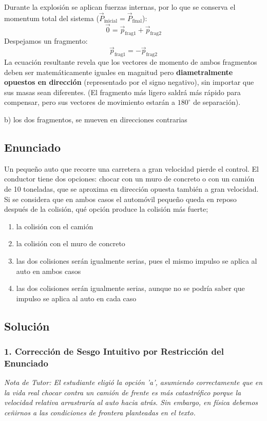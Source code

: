 \documentclass[12pt, a4paper]{article}
\begin{document}
Durante la explosión se aplican fuerzas internas, por lo que se conserva el momentum total del sistema ($\vec{P}_{\text{inicial}} = \vec{P}_{\text{final}}$):
$$ \vec{0} = \vec{p}_{\text{frag1}} + \vec{p}_{\text{frag2}} $$
Despejamos un fragmento:
$$ \vec{p}_{\text{frag1}} = -\vec{p}_{\text{frag2}} $$
La ecuación resultante revela que los vectores de momento de ambos fragmentos deben ser matemáticamente iguales en magnitud pero \textbf{diametralmente opuestos en dirección} (representado por el signo negativo), sin importar que sus masas sean diferentes. (El fragmento más ligero saldrá más rápido para compensar, pero sus vectores de movimiento estarán a $180^\circ$ de separación).

\begin{tcolorbox}[colback=green!5!white, colframe=green!50!black, title=Respuesta Final]
\centering \Large b) los dos fragmentos, se mueven en direcciones contrarias
\end{tcolorbox}

\newpage

\subsection*{Enunciado}
Un pequeño auto que recorre una carretera a gran velocidad pierde el control. El conductor tiene dos opciones: chocar con un muro de concreto o con un camión de 10 toneladas, que se aproxima en dirección opuesta también a gran velocidad. Si se considera que en ambos casos el automóvil pequeño queda en reposo después de la colisión, qué opción produce la colisión más fuerte;
\begin{enumerate}[label=\alph*)]
    \item la colisión con el camión
    \item la colisión con el muro de concreto
    \item las dos colisiones serán igualmente serias, pues el mismo impulso se aplica al auto en ambos casos
    \item las dos colisiones serán igualmente serias, aunque no se podría saber que impulso se aplica al auto en cada caso
\end{enumerate}

\subsection*{Solución}

\subsubsection*{1. Corrección de Sesgo Intuitivo por Restricción del Enunciado}
\textit{Nota de Tutor: El estudiante eligió la opción 'a', asumiendo correctamente que en la vida real chocar contra un camión de frente es más catastrófico porque la velocidad relativa arrastraría al auto hacia atrás. Sin embargo, en física debemos ceñirnos a las condiciones de frontera planteadas en el texto.}
\end{document}
